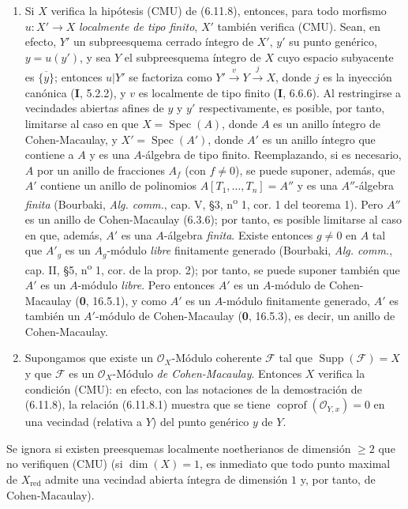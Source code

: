 \begin{remarks}[6.11.9]
\label{IV.2.s6.11.9-fr}
\begin{enumerate}
\item[(i)] Si $X$ verifica la hipótesis (CMU) de (6.11.8), entonces, para todo
morfismo $u:X'\to X$ \emph{localmente de tipo finito}, $X'$ también verifica (CMU).
Sean, en efecto, $Y'$ un subpreesquema cerrado íntegro de $X'$, $y'$ su punto
genérico, $y=u(y')$, y sea $Y$ el subpreesquema íntegro de $X$ cuyo
espacio subyacente es $\overline{\{y\}}$; entonces $u|Y'$ se factoriza como
$Y'\xrightarrow{v}Y\xrightarrow{j}X$, donde $j$ es la inyección canónica
(\textbf I, 5.2.2), y $v$ es localmente de tipo finito (\textbf I, 6.6.6). Al restringirse
a vecindades abiertas afines de $y$ y $y'$ respectivamente,
es posible, por tanto, limitarse al caso en que $X=\operatorname{Spec}(A)$, donde $A$ es un
anillo íntegro de Cohen-Macaulay, y $X'=\operatorname{Spec}(A')$, donde $A'$
es un anillo
íntegro que contiene a $A$ y es una $A$-álgebra de tipo finito.
Reemplazando, si es necesario, $A$ por un anillo de fracciones $A_f$ (con $f\ne0$),
se puede suponer, además, que $A'$ contiene un anillo de polinomios
$A[T_1,\ldots,T_n]=A''$ y es una $A''$-álgebra \emph{finita} (Bourbaki,
\emph{Alg. comm.}, cap. V, \S3, n\textsuperscript{o} 1, cor. 1 del teorema 1).
Pero $A''$ es un anillo de Cohen-Macaulay (6.3.6); por tanto, es posible limitarse
al caso en que, además, $A'$ es una $A$-álgebra \emph{finita}. Existe entonces $g\ne0$ en
$A$ tal que $A'_g$ es un $A_g$-módulo \emph{libre} finitamente generado (Bourbaki,
\emph{Alg. comm.}, cap. II, \S5, n\textsuperscript{o} 1, cor. de la
prop. 2); por tanto, se puede suponer también que $A'$ es un $A$-módulo
\emph{libre}. Pero entonces $A'$ es un $A$-módulo de Cohen-Macaulay (\textbf 0, 16.5.1), y
como $A'$ es un $A$-módulo finitamente generado, $A'$ es también un $A'$-módulo de
Cohen-Macaulay (\textbf 0, 16.5.3), es decir, un anillo de Cohen-Macaulay.
\item[(ii)] Supongamos que existe un $\mathcal O_X$-Módulo coherente
$\mathcal F$ tal que $\operatorname{Supp}(\mathcal F)=X$ y que
$\mathcal F$ es un $\mathcal O_X$-Módulo \emph{de Cohen-Macaulay}. Entonces $X$
verifica la condición (CMU): en efecto, con las notaciones de la demostración
de (6.11.8), la relación (6.11.8.1) muestra que se tiene
$\operatorname{coprof}(\mathcal O_{Y,x})=0$ en una vecindad (relativa a
$Y$) del punto genérico $y$ de $Y$.
\end{enumerate}

Se ignora si existen preesquemas localmente noetherianos de dimensión
$\geq2$ que no verifiquen (CMU) (si $\dim(X)=1$, es inmediato que todo
punto maximal de $X_{\mathrm{red}}$ admite una vecindad abierta íntegra de
dimensión $1$ y, por tanto, de Cohen-Macaulay).
\end{remarks}
